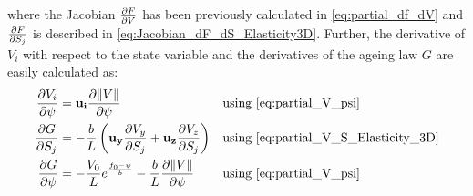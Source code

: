 where the Jacobian $\pdv{F}{V}$ has been previously calculated in \autoref{eq:partial_df_dV} and $\pdv{F}{S_j}$ is described in \autoref{eq:Jacobian_dF_dS_Elasticity3D}. Further, the derivative of $V_i$ with respect to the state variable and the derivatives of the ageing law $G$ are easily calculated as:
\begin{align}
	\label{eq:partial_dV_dpsi_elasticity_3D}
	\pdv{V_i}{\psi} &= \mathbf{u_i}\pdv{\norm{V}}{\psi} & &\text{using \autoref{eq:partial_V_psi}} \\
	\pdv{G}{S_j}    &= -\frac{b}{L}\left(\mathbf{u_y}\pdv{V_y}{S_j} + \mathbf{u_z}\pdv{V_z}{S_j}\right) & &\text{using \autoref{eq:partial_V_S_Elasticity_3D}} \\
	\pdv{G}{\psi}    &= -\frac{V_0}{L}e^{\frac{f_0 - \psi}{b}} -\frac{b}{L}\pdv{\norm{V}}{\psi} & & \text{using \autoref{eq:partial_V_psi}}
\end{align}

